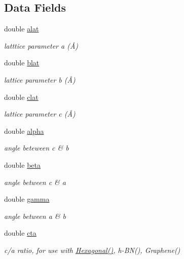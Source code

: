 \subsection*{Data Fields}
\begin{DoxyCompactItemize}
\item 
double \hyperlink{class_reader_ae27e67c8d78fb8fac565ec079529b589}{alat}
\begin{DoxyCompactList}\small\item\em latttice parameter a (Å) \end{DoxyCompactList}\item 
double \hyperlink{class_reader_a8e2240f9ad9a7c1423e0888e474f4c9e}{blat}
\begin{DoxyCompactList}\small\item\em lattice parameter b (Å) \end{DoxyCompactList}\item 
double \hyperlink{class_reader_ad10c6e643d5cb651bed0c96790099b51}{clat}
\begin{DoxyCompactList}\small\item\em lattice parameter c (Å) \end{DoxyCompactList}\item 
double \hyperlink{class_reader_a421cb70a4a8746a68fe2618ed597c5a0}{alpha}
\begin{DoxyCompactList}\small\item\em angle beteween c \& b \end{DoxyCompactList}\item 
double \hyperlink{class_reader_a47234e1e633f932334c4304cf01824a1}{beta}
\begin{DoxyCompactList}\small\item\em angle between c \& a \end{DoxyCompactList}\item 
double \hyperlink{class_reader_ab2127a4e365fd3528c017a76375d60c4}{gamma}
\begin{DoxyCompactList}\small\item\em angle between a \& b \end{DoxyCompactList}\item 
double \hyperlink{class_reader_a6eb90d21148a08f9ef4e3dc478917d63}{cta}
\begin{DoxyCompactList}\small\item\em c/a ratio, for use with \hyperlink{class_hexagonal}{Hexagonal()}, h-\/\+B\+N(), Graphene() \end{DoxyCompactList}\item 

\end{DoxyCompactItemize}
